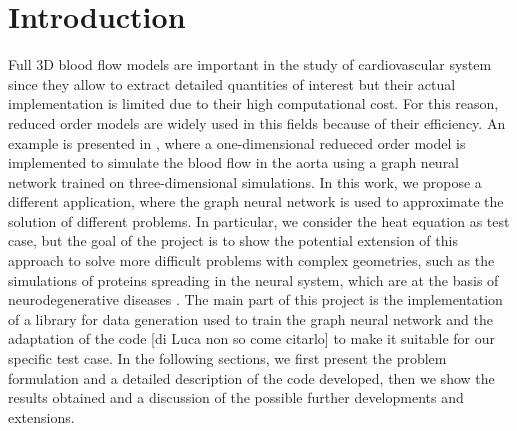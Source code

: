 \documentclass[11pt,a4paper]{article}
\begin{document}




\section{Introduction}
Full 3D blood flow models are important in the study of cardiovascular system 
since they allow to extract detailed quantities of interest but their actual 
implementation is limited due to their high computational cost. 
For this reason, reduced order models are widely used in this fields because of 
their efficiency. An example is presented in \cite{Luca}, where a one-dimensional
redueced order model is implemented to simulate the blood flow in the aorta using 
a graph neural network trained on three-dimensional simulations. In this work,
we propose a different application, where the graph neural network is used to 
approximate the solution of different problems. In particular, we consider the
heat equation as test case, but the goal of the project is to show the potential
extension of this approach to solve more difficult problems with complex geometries,
such as the simulations of proteins spreading in the neural system, which are at
the basis of neurodegenerative diseases \cite{MattiaCorti}.
The main part of this project is the implementation of a library for data generation 
used to train the graph neural network and the adaptation of the code [di Luca 
non so come citarlo] to make it suitable for our specific test case. In the following sections, 
we first present the problem formulation and a detailed description of the code 
developed, then we show the results obtained and a discussion of the possible 
further developments and extensions.

\end{document}
